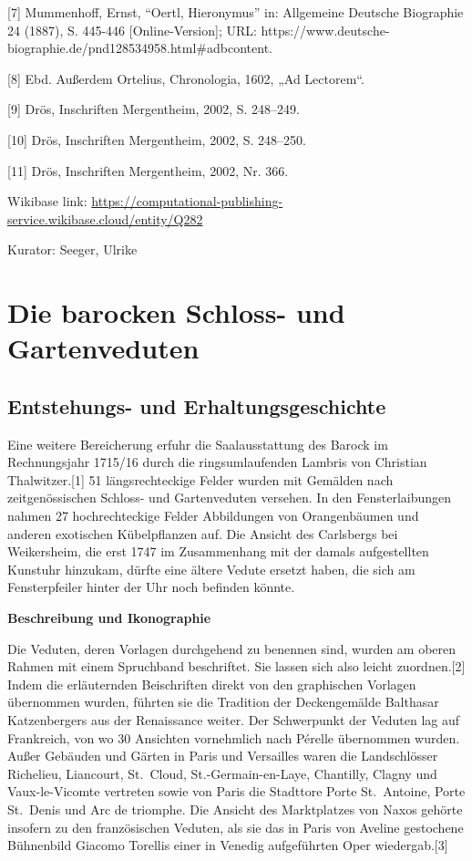 \documentclass[
  letterpaper,
]{book}
\begin{document}
{[}7{]} Mummenhoff, Ernst, ``Oertl, Hieronymus'' in: Allgemeine Deutsche
Biographie 24 (1887), S. 445-446 {[}Online-Version{]}; URL:
https://www.deutsche-biographie.de/pnd128534958.html\#adbcontent.

{[}8{]} Ebd. Außerdem Ortelius, Chronologia, 1602, „Ad Lectorem``.

{[}9{]} Drös, Inschriften Mergentheim, 2002, S. 248--249.

{[}10{]} Drös, Inschriften Mergentheim, 2002, S. 248--250.

{[}11{]} Drös, Inschriften Mergentheim, 2002, Nr. 366.

Wikibase link:
\url{https://computational-publishing-service.wikibase.cloud/entity/Q282}

Kurator: Seeger, Ulrike


\chapter{Die barocken Schloss- und
Gartenveduten}\label{die-barocken-schloss--und-gartenveduten}

\section{Entstehungs- und
Erhaltungsgeschichte}\label{entstehungs--und-erhaltungsgeschichte}

Eine weitere Bereicherung erfuhr die Saalausstattung des Barock im
Rechnungsjahr 1715/16 durch die ringsumlaufenden Lambris von Christian
Thalwitzer.{[}1{]} 51 längsrechteckige Felder wurden mit Gemälden nach
zeitgenössischen Schloss- und Gartenveduten versehen. In den
Fensterlaibungen nahmen 27 hochrechteckige Felder Abbildungen von
Orangenbäumen und anderen exotischen Kübelpflanzen auf. Die Ansicht des
Carlsbergs bei Weikersheim, die erst 1747 im Zusammenhang mit der damals
aufgestellten Kunstuhr hinzukam, dürfte eine ältere Vedute ersetzt
haben, die sich am Fensterpfeiler hinter der Uhr noch befinden könnte.

\textbf{Beschreibung und Ikonographie}

Die Veduten, deren Vorlagen durchgehend zu benennen sind, wurden am
oberen Rahmen mit einem Spruchband beschriftet. Sie lassen sich also
leicht zuordnen.{[}2{]} Indem die erläuternden Beischriften direkt von
den graphischen Vorlagen übernommen wurden, führten sie die Tradition
der Deckengemälde Balthasar Katzenbergers aus der Renaissance weiter.
Der Schwerpunkt der Veduten lag auf Frankreich, von wo 30 Ansichten
vornehmlich nach Pérelle übernommen wurden. Außer Gebäuden und Gärten in
Paris und Versailles waren die Landschlösser Richelieu, Liancourt,
St.~Cloud, St.-Germain-en-Laye, Chantilly, Clagny und Vaux-le-Vicomte
vertreten sowie von Paris die Stadttore Porte St.~Antoine, Porte
St.~Denis und Arc de triomphe. Die Ansicht des Marktplatzes von Naxos
gehörte insofern zu den französischen Veduten, als sie das in Paris von
Aveline gestochene Bühnenbild Giacomo Torellis einer in Venedig
aufgeführten Oper wiedergab.{[}3{]}
\end{document}
